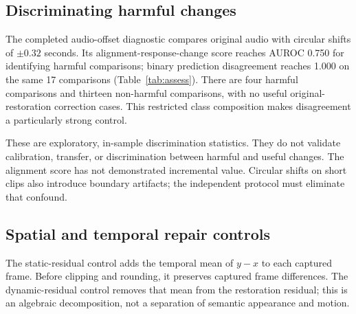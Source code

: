 \subsection{Discriminating harmful changes}
The completed audio-offset diagnostic compares original audio with circular shifts of $\pm0.32$ seconds. Its alignment-response-change score reaches AUROC 0.750 for identifying harmful comparisons; binary prediction disagreement reaches 1.000 on the same 17 comparisons (Table~\ref{tab:assess}). There are four harmful comparisons and thirteen non-harmful comparisons, with no useful original-restoration correction cases. This restricted class composition makes disagreement a particularly strong control.

These are exploratory, in-sample discrimination statistics. They do not validate calibration, transfer, or discrimination between harmful and useful changes. The alignment score has not demonstrated incremental value. Circular shifts on short clips also introduce boundary artifacts; the independent protocol must eliminate that confound.

\begin{table}[t]
\centering\small
\caption{Exploratory harmful-comparison detection on 17 comparisons: four positive and thirteen negative. No independent-test inference is implied.}
\label{tab:assess}
\end{table}

\subsection{Spatial and temporal repair controls}
The static-residual control adds the temporal mean of $y-x$ to each captured frame. Before clipping and rounding, it preserves captured frame differences. The dynamic-residual control removes that mean from the restoration residual; this is an algebraic decomposition, not a separation of semantic appearance and motion.


